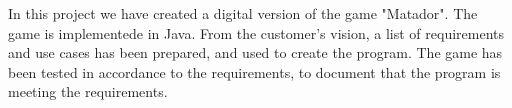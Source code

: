 In this project we have created a digital version of the game "Matador". The game is implementede in Java. From the customer's vision, a list of requirements and use cases has been prepared, and used to create the program. The game has been tested in accordance to the requirements, to document that the program is meeting the requirements. 
